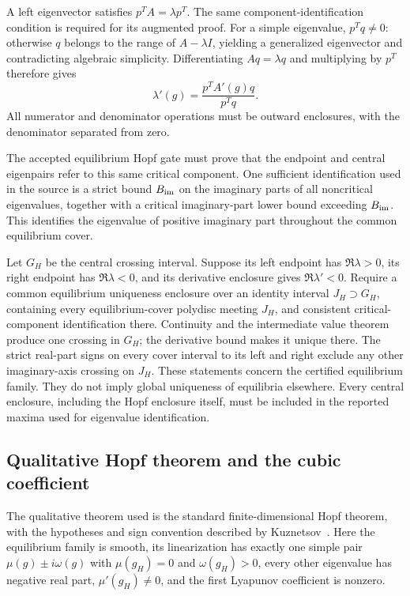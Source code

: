 \documentclass[11pt]{article}
\theoremstyle{definition}
\begin{document}
A left eigenvector satisfies $p^TA=\lambda p^T$. The same component-identification condition is required for its augmented proof. For a simple eigenvalue, $p^Tq\ne0$: otherwise $q$ belongs to the range of $A-\lambda I$, yielding a generalized eigenvector and contradicting algebraic simplicity. Differentiating $Aq=\lambda q$ and multiplying by $p^T$ therefore gives
\[
 \lambda'(g)=\frac{p^TA'(g)q}{p^Tq}.
\]
All numerator and denominator operations must be outward enclosures, with the denominator separated from zero.

The accepted equilibrium Hopf gate must prove that the endpoint and central eigenpairs refer to this same critical component. One sufficient identification used in the source is a strict bound $B_{\rm im}$ on the imaginary parts of all noncritical eigenvalues, together with a critical imaginary-part lower bound exceeding $B_{\rm im}$. This identifies the eigenvalue of positive imaginary part throughout the common equilibrium cover.

Let $G_H$ be the central crossing interval. Suppose its left endpoint has $\Re\lambda>0$, its right endpoint has $\Re\lambda<0$, and its derivative enclosure gives $\Re\lambda'<0$. Require a common equilibrium uniqueness enclosure over an identity interval $J_H\supset G_H$, containing every equilibrium-cover polydisc meeting $J_H$, and consistent critical-component identification there. Continuity and the intermediate value theorem produce one crossing in $G_H$; the derivative bound makes it unique there. The strict real-part signs on every cover interval to its left and right exclude any other imaginary-axis crossing on $J_H$. These statements concern the certified equilibrium family. They do not imply global uniqueness of equilibria elsewhere. Every central enclosure, including the Hopf enclosure itself, must be included in the reported maxima used for eigenvalue identification.

\subsection{Qualitative Hopf theorem and the cubic coefficient}\label{sec:ha-4}

The qualitative theorem used is the standard finite-dimensional Hopf theorem, with the hypotheses and sign convention described by Kuznetsov~\cite{kuznetsov2006}. Here the equilibrium family is smooth, its linearization has exactly one simple pair $\mu(g)\pm i\omega(g)$ with $\mu(g_H)=0$ and $\omega(g_H)>0$, every other eigenvalue has negative real part, $\mu'(g_H)\ne0$, and the first Lyapunov coefficient is nonzero.
\end{document}
